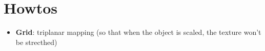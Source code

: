 \chapter{Howtos}

\begin{itemize}
  \item \textbf{Grid}: triplanar mapping (so that when the object is scaled,
  the texture won't be strecthed)
\end{itemize}
